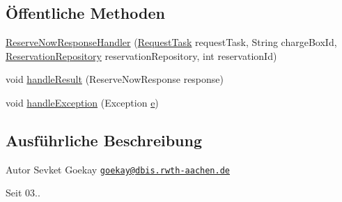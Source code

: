 \subsection*{Öffentliche Methoden}
\begin{DoxyCompactItemize}
\item 
\hyperlink{classde_1_1rwth_1_1idsg_1_1steve_1_1handler_1_1ocpp15_1_1_reserve_now_response_handler_a4fa6d13611deb6163089281485a7bad9}{Reserve\-Now\-Response\-Handler} (\hyperlink{classde_1_1rwth_1_1idsg_1_1steve_1_1web_1_1dto_1_1task_1_1_request_task}{Request\-Task} request\-Task, String charge\-Box\-Id, \hyperlink{interfacede_1_1rwth_1_1idsg_1_1steve_1_1repository_1_1_reservation_repository}{Reservation\-Repository} reservation\-Repository, int reservation\-Id)
\item 
void \hyperlink{classde_1_1rwth_1_1idsg_1_1steve_1_1handler_1_1ocpp15_1_1_reserve_now_response_handler_a8a9abad92eff0284e98129aaf31e811e}{handle\-Result} (Reserve\-Now\-Response response)
\item 
void \hyperlink{classde_1_1rwth_1_1idsg_1_1steve_1_1handler_1_1ocpp15_1_1_reserve_now_response_handler_a0fafdd840ba364a594893cad7c17a6c3}{handle\-Exception} (Exception \hyperlink{jquery-ui_8min_8js_a2c038346d47955cbe2cb91e338edd7e1}{e})
\end{DoxyCompactItemize}


\subsection{Ausführliche Beschreibung}
\begin{DoxyAuthor}{Autor}
Sevket Goekay \href{mailto:goekay@dbis.rwth-aachen.de}{\tt goekay@dbis.\-rwth-\/aachen.\-de} 
\end{DoxyAuthor}
\begin{DoxySince}{Seit}
03.. 
\end{DoxySince}


